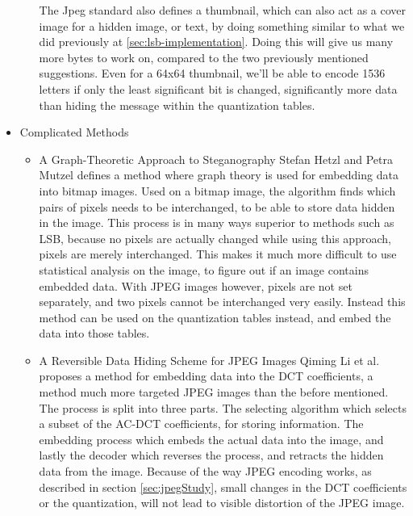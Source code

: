 \begin{itemize}
\begin{itemize}
		The Jpeg standard also defines a thumbnail, which can also act as a cover image for a hidden image, or text, by doing something similar to what we did previously at \ref{sec:lsb-implementation}.
		Doing this will give us many more bytes to work on, compared to the two previously mentioned suggestions. 
		Even for a 64x64 thumbnail, we'll be able to encode 1536 letters if only the least significant bit is changed, significantly more data than hiding the message within the quantization tables.
	\end{itemize}
	\item Complicated Methods
	\begin{itemize}
		\item A Graph-Theoretic Approach to Steganography
		Stefan Hetzl and Petra Mutzel defines a method where graph theory is used for embedding data into bitmap images\citep{hetzl_2005}. Used on a bitmap image, the algorithm finds which pairs of pixels needs to be interchanged, to be able to store data hidden in the image. This process is in many ways superior to methods such as LSB, because no pixels are actually changed while using this approach, pixels are merely interchanged. This makes it much more difficult to use statistical analysis on the image, to figure out if an image contains embedded data. With JPEG images however, pixels are not set separately, and two pixels cannot be interchanged very easily. Instead this method can be used on the quantization tables instead, and embed the data into those tables.  

		\item A Reversible Data Hiding Scheme for JPEG Images
		Qiming Li et al. proposes a method for embedding data into the DCT coefficients\citep{Li2010}, a method much more targeted JPEG images than the before mentioned. The process is split into three parts. The selecting algorithm which selects a subset of the AC-DCT coefficients, for storing information. The embedding process which embeds the actual data into the image, and lastly the decoder which reverses the process, and retracts the hidden data from the image. Because of the way JPEG encoding works, as described in section \ref{sec:jpegStudy}, small changes in the DCT coefficients or the quantization, will not lead to visible distortion of the JPEG image.

	\end{itemize}
\end{itemize}
